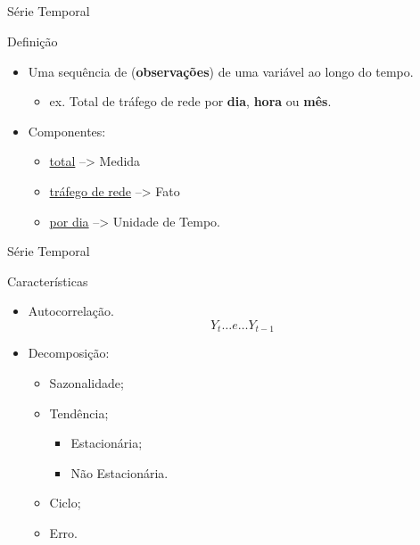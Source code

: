\documentclass[aspectratio=169]{beamer}
\begin{document}
\subsection{}
\begin{frame}{Série Temporal}
\begin{block}{Definição}

    \begin{itemize}
        \item Uma sequência de (\textbf{observações}) de uma variável ao longo do tempo.
        \begin{itemize}[triangle]
            \item ex. Total de tráfego de rede por \textbf{dia}, \textbf{hora} ou \textbf{mês}.
        \end{itemize}
        \item Componentes:
        \begin{itemize}[triangle]
            \item \underline{total} --> Medida      \item \underline {tráfego de rede} --> Fato
            \item \underline{por dia} --> Unidade de Tempo.
        \end{itemize}
        \end{itemize}
    \end{block}  
\end{frame}

\begin{frame}{Série Temporal}
\begin{block}{Características}
        \begin{itemize}
            \item Autocorrelação.
            \begin{equation}
            Y_{t} \dots e \dots Y_{t - 1}
            \end{equation}
            \item Decomposição:
                \begin{itemize}[triangle]
                    \item Sazonalidade;
                    \item Tendência;
                        \begin{itemize}[square]\small
                            \item Estacionária;
                            \item Não Estacionária.
                        \end{itemize}
                    \item Ciclo;
                    \item Erro.
                \end{itemize}
        \end{itemize}
        \end{block}
\end{frame}
\end{document}
